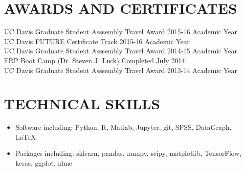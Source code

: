 \documentclass[line,margin,10pt]{res}
\begin{document}
\begin{resume}
\section{AWARDS AND CERTIFICATES}
UC Davis Graduate Student Asssembly Travel Award \hfill 2015-16 Academic Year\\
UC Davis FUTURE Certificate Track \hfill 2015-16 Academic Year\\
UC Davis Graduate Student Asssembly Travel Award \hfill 2014-15 Academic Year\\
ERP Boot Camp (Dr. Steven J. Luck) \hfill Completed July 2014\\
UC Davis Graduate Student Asssembly Travel Award \hfill 2013-14 Academic Year

 \section{TECHNICAL SKILLS} 
 \begin{itemize}[leftmargin=-2pt] \itemsep -2pt
\item [] Software including: Python, R, Matlab, Jupyter, git, SPSS, DataGraph, \LaTeX\ 
\item []Packages including: sklearn, pandas, numpy, scipy, matplotlib, TensorFlow, keras, ggplot, nlme
 \end{itemize}


\end{resume}
\end{document}
